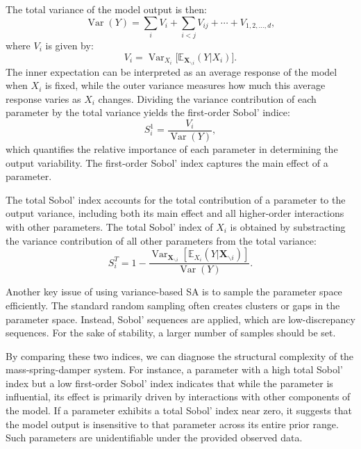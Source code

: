 The total variance of the model output is then:
\begin{equation}
    \operatorname{Var}(Y) = \sum_i V_i + \sum_{i<j} V_{ij} + \cdots + V_{1,2,\ldots,d},
\end{equation}
where $V_i$ is given by:
\begin{equation}
    V_i = \operatorname{Var}_{X_i}\big[\mathbb{E}_{\boldsymbol{X}_{\backslash i}}(Y|X_i)\big].
\end{equation}
The inner expectation can be interpreted as an average response of the model when $X_i$ is fixed, while the outer variance measures how much this average response varies as $X_i$ changes. Dividing the variance contribution of each parameter by the total variance yields the first-order Sobol' indice:
\begin{equation}
    S^1_i = \frac{V_i}{\operatorname{Var}(Y)},
\end{equation}
which quantifies the relative importance of each parameter in determining the output variability. The first-order Sobol' index captures the main effect of a parameter.

The total Sobol' index accounts for the total contribution of a parameter to the output variance, including both its main effect and all higher-order interactions with other parameters. The total Sobol' index of $X_i$ is obtained by substracting the variance contribution of all other parameters from the total variance:
\begin{equation}
    S^T_i = 1-\frac{\operatorname{Var}_{\boldsymbol{X}_{\backslash i}}[\mathbb{E}_{X_i}(Y|\boldsymbol{X}_{\backslash i})]}{\operatorname{Var}(Y)}.
\end{equation}

Another key issue of using variance-based \ac{SA} is to sample the parameter space efficiently. The standard random sampling often creates clusters or gaps in the parameter space. Instead, Sobol' sequences are applied, which are low-discrepancy sequences. For the sake of stability, a larger number of samples should be set.

By comparing these two indices, we can diagnose the structural complexity of the mass-spring-damper system. For instance, a parameter with a high total Sobol' index but a low first-order Sobol' index indicates that while the parameter is influential, its effect is primarily driven by interactions with other components of the model. If a parameter exhibits a total Sobol' index near zero, it suggests that the model output is insensitive to that parameter across its entire prior range. Such parameters are unidentifiable under the provided observed data. 

